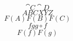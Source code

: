 \documentclass[14pt]{beamer}
\begin{document}
\begin{frame}
$$ \cat{C} \cat{D} $$
$$ A B C X Y Z $$
$$ F(A) F(B) F(C) $$
\small $$ f g g \circ f $$
\small $$ F(f) F(g) $$
\end{frame}
\end{document}
